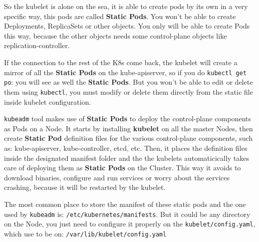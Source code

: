 \documentclass{article}
\begin{document}
So the kubelet is alone on the sea, it is able to create pods by its own in a very specific way, this pods are called \textbf{Static Pods}. You won't be able to create Deployments, ReplicaSets or other objects. You only will be able to create Pods this way, because the other objects needs some control-plane objects like replication-controller. 

If the connection to the rest of the K8s come back, the kubelet will create a mirror of all the \textbf{Static Pods} on the kube-apiserver, so if you do \verb|kubectl get po|: you will see as well the \textbf{Static Pods}. But you won't be able to edit or delete them using \verb|kubectl|, you must modify or delete them directly from the static file inside kubelet configuration.

\verb|kubeadm| tool makes use of \textbf{Static Pods} to deploy the control-plane components as Pods on a Node. It starts by installing \textbf{kubelet} on all the master Nodes, then create \textbf{Static Pod} definition files for the various control-plane components, such as: kube-apiserver, kube-controller, etcd, etc.
Then, it places the definition files inside the designated manifest folder and the the kubelets automaticically takes care of deploying
them as \textbf{Static Pods} on the Cluster. This way it avoids to download binaries, configure and run services or worry about the services crashing,
because it will be restarted by the kubelet.

The most common place to store the manifest of these static pods and the one used by \verb|kubeadm| is: \verb|/etc/kubernetes/manifests|. But it could be any directory on the Node, you just need to configure it properly on the \verb|kubelet/config.yaml|, which use to be on: \verb|/var/lib/kubelet/config.yaml|
\end{document}
